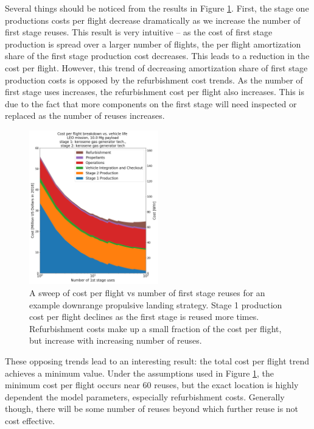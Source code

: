 \documentclass[conf]{new-aiaa}
\begin{document}
\begin{multicols}{2}
Several things should be noticed from the results in Figure \ref{fig:cpf_stackplot_reuses_sweep}. First, the stage one productions costs per flight decrease dramatically as we increase the number of first stage reuses. This result is very intuitive -- as the cost of first stage production is spread over a larger number of flights, the per flight amortization share of the first stage production cost decreases. This leads to a reduction in the cost per flight. However, this trend of decreasing amortization share of first stage production costs is opposed by the refurbishment cost trends. As the number of first stage uses increases, the refurbishment cost per flight also increases. This is due to the fact that more components on the first stage will need inspected or replaced  as the number of reuses increases. 

\begin{figure}[H]
    \centering
    \includegraphics[width=0.5\textwidth]{../../lvreuse/analysis/combined/plots/cpf_stackplot_reuses_sweep}
    \caption{\label{fig:cpf_stackplot_reuses_sweep} A sweep of cost per flight vs number of first stage reuses for an example downrange propulsive landing strategy. Stage 1 production cost per flight declines as the first stage is reused more times. Refurbishment costs make up a small fraction of the cost per flight, but increase with increasing number of reuses.}
\end{figure}

These opposing trends lead to an interesting result: the total cost per flight trend achieves a minimum value. Under the assumptions used in Figure \ref{fig:cpf_stackplot_reuses_sweep}, the minimum cost per flight occurs near 60 reuses, but the exact location is highly dependent the model parameters, especially refurbishment costs. Generally though, there will be some number of reuses beyond which further reuse is not cost effective.



\end{multicols}
\end{document}
